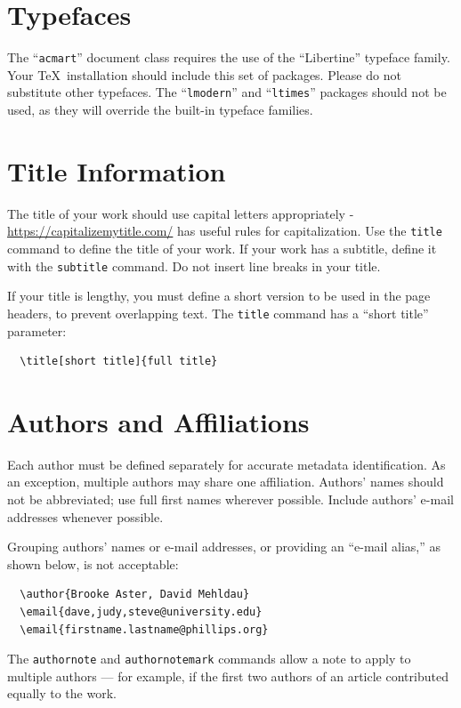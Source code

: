 \section{Typefaces}

The ``\verb|acmart|'' document class requires the use of the
``Libertine'' typeface family. Your \TeX\ installation should include
this set of packages. Please do not substitute other typefaces. The
``\verb|lmodern|'' and ``\verb|ltimes|'' packages should not be used,
as they will override the built-in typeface families.

\section{Title Information}

The title of your work should use capital letters appropriately -
\url{https://capitalizemytitle.com/} has useful rules for
capitalization. Use the {\verb|title|} command to define the title of
your work. If your work has a subtitle, define it with the
{\verb|subtitle|} command.  Do not insert line breaks in your title.

If your title is lengthy, you must define a short version to be used
in the page headers, to prevent overlapping text. The \verb|title|
command has a ``short title'' parameter:
\begin{verbatim}
  \title[short title]{full title}
\end{verbatim}

\section{Authors and Affiliations}

Each author must be defined separately for accurate metadata
identification.  As an exception, multiple authors may share one
affiliation. Authors' names should not be abbreviated; use full first
names wherever possible. Include authors' e-mail addresses whenever
possible.

Grouping authors' names or e-mail addresses, or providing an ``e-mail
alias,'' as shown below, is not acceptable:
\begin{verbatim}
  \author{Brooke Aster, David Mehldau}
  \email{dave,judy,steve@university.edu}
  \email{firstname.lastname@phillips.org}
\end{verbatim}

The \verb|authornote| and \verb|authornotemark| commands allow a note
to apply to multiple authors --- for example, if the first two authors
of an article contributed equally to the work.

